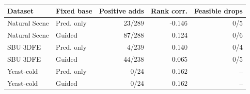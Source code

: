 \begin{center}
\begin{tabular}{llrrr}
\hline
Dataset & Fixed base & Positive adds & Rank corr. & Feasible drops\\
\hline
Natural Scene & Pred. only & 23/289 & -0.146 & 0/5\\
Natural Scene & Guided & 87/288 & 0.124 & 0/6\\
SBU-3DFE & Pred. only & 4/239 & 0.140 & 0/4\\
SBU-3DFE & Guided & 44/238 & 0.065 & 0/5\\
Yeast-cold & Pred. only & 0/24 & 0.162 & --\\
Yeast-cold & Guided & 0/24 & 0.162 & --\\
\hline
\end{tabular}
\end{center}